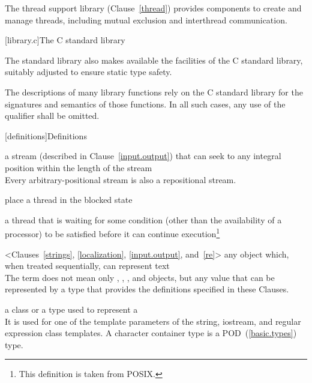 \pnum
The thread support library (Clause~\ref{thread}) provides components to create
and manage threads, including mutual exclusion and interthread communication.

[library.c]{The C standard library}

\pnum
The \Cpp standard library also makes available the facilities of the C standard library,
%
suitably adjusted to ensure static type safety.

\pnum
The descriptions of many library functions rely on the C standard library for
the signatures and semantics of those functions. In all such cases, any use of
the  qualifier shall be omitted.

[definitions]{Definitions}

%
a stream (described in Clause~\ref{input.output}) that can seek to any integral position within
the length of the stream\\
\enternote Every arbitrary-positional stream is also a repositional stream. \exitnote

%
place a thread in the blocked state

%
a thread that is waiting for some condition (other than the availability of a processor) to be
satisfied before it can continue execution\footnote{This definition is taken from POSIX.}

%
<Clauses~\ref{strings}, \ref{localization}, \ref{input.output}, and~\ref{re}>
any object which,
when treated sequentially,
can represent text\\
\enternote
The term does not mean only
,
,
,
and
objects,
but any value that can be represented by a type
that provides the definitions specified in these Clauses.
\exitnote

%
a class or a type used to
represent a
\\
\enternote
It is used for one of the template parameters of the string,
iostream, and regular expression class templates.
A character container type is a POD~(\ref{basic.types}) type.
\exitnote

